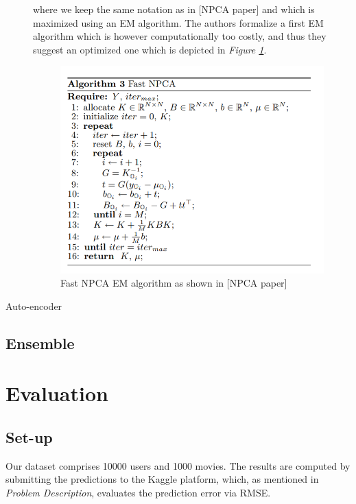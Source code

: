 \documentclass[10pt,conference,compsocconf]{IEEEtran}
\begin{document}
\begin{description}
\noindent where we keep the same notation as in [NPCA paper] and which is maximized using an EM algorithm. The authors formalize a first EM algorithm which is however computationally too costly, and thus they suggest an optimized one which is depicted in \emph{Figure \ref{emnpca}}.

\begin{figure}[h!]
\centering
\includegraphics[scale=0.6]{emnpca.png}
\caption{Fast NPCA EM algorithm as shown in [NPCA paper]}
\label{emnpca}
\end{figure} 

\item[Auto-encoder]


\end{description}

\subsection{Ensemble}

\section{Evaluation}
\label{res}

\subsection{Set-up}

Our dataset comprises 10000 users and 1000 movies. The results are computed by submitting the predictions to the Kaggle platform, which, as mentioned in \emph{Problem Description}, evaluates the prediction error via RMSE.
\end{document}
